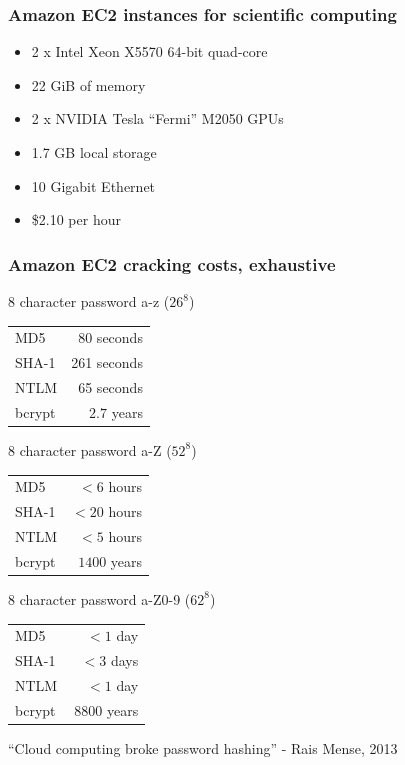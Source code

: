 \documentclass{beamer}
\begin{document}
\begin{frame}
    \frametitle{Amazon EC2 instances for scientific computing}
    \begin{itemize}
      \item 2 x Intel Xeon X5570 64-bit quad-core
      \item 22 GiB of memory
      \item 2 x NVIDIA Tesla ``Fermi'' M2050 GPUs
      \item 1.7 GB local storage
      \item 10 Gigabit Ethernet
      \item \$2.10 per hour
    \end{itemize}
\end{frame}

\begin{frame}[fragile]
    \frametitle{Amazon EC2 cracking costs, exhaustive}
    8 character password a-z ($26^8$)
    \begin{tabular}{l | r}
    MD5 & 80 seconds \\
    SHA-1 & 261 seconds \\
    NTLM & 65 seconds \\
    bcrypt & $~2.7$ years \\
    \end{tabular}
    
    8 character password a-Z ($52^8$)
    \begin{tabular}{l | r}
    MD5 & $<6$ hours \\
    SHA-1 & $<20$ hours \\
    NTLM & $<5$ hours \\
    bcrypt & $~1400$ years \\
    \end{tabular}

    8 character password a-Z0-9 ($62^8$)
    \begin{tabular}{l | r}
    MD5 & $<1$ day \\
    SHA-1 & $<3$ days \\
    NTLM & $<1$ day \\
    bcrypt & $~8800$ years \\
    \end{tabular}

    \footnotesize{``Cloud computing broke password hashing'' - Rais Mense, 2013}
\end{frame}
\end{document}
